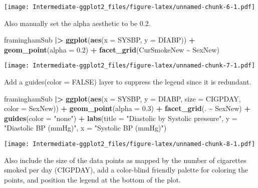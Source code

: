 \documentclass[
]{article}
\newenvironment{Shaded}{\begin{snugshade}}{\end{snugshade}}
\newcommand{\AttributeTok}[1]{\textcolor[rgb]{0.13,0.29,0.53}{#1}}
\newcommand{\FloatTok}[1]{\textcolor[rgb]{0.00,0.00,0.81}{#1}}
\newcommand{\FunctionTok}[1]{\textcolor[rgb]{0.13,0.29,0.53}{\textbf{#1}}}
\newcommand{\NormalTok}[1]{#1}
\newcommand{\SpecialCharTok}[1]{\textcolor[rgb]{0.81,0.36,0.00}{\textbf{#1}}}
\newcommand{\StringTok}[1]{\textcolor[rgb]{0.31,0.60,0.02}{#1}}
\begin{document}
\texttt{[image: Intermediate-ggplot2\_files/figure-latex/unnamed-chunk-6-1.pdf]}

Also manually set the alpha aesthetic to be 0.2.

\begin{Shaded}
\begin{Highlighting}[]
\NormalTok{framinghamSub }\SpecialCharTok{|\textgreater{}} 
  \FunctionTok{ggplot}\NormalTok{(}\FunctionTok{aes}\NormalTok{(}\AttributeTok{x =}\NormalTok{ SYSBP, }\AttributeTok{y =}\NormalTok{ DIABP)) }\SpecialCharTok{+}
  \FunctionTok{geom\_point}\NormalTok{(}\AttributeTok{alpha =} \FloatTok{0.2}\NormalTok{) }\SpecialCharTok{+}
  \FunctionTok{facet\_grid}\NormalTok{(CurSmokeNew }\SpecialCharTok{\textasciitilde{}}\NormalTok{ SexNew)}
\end{Highlighting}
\end{Shaded}

\texttt{[image: Intermediate-ggplot2\_files/figure-latex/unnamed-chunk-7-1.pdf]}

Add a guides(color = FALSE) layer to suppress the legend since it is
redundant.

\begin{Shaded}
\begin{Highlighting}[]
\NormalTok{framinghamSub }\SpecialCharTok{|\textgreater{}}
  \FunctionTok{ggplot}\NormalTok{(}\FunctionTok{aes}\NormalTok{(}\AttributeTok{x =}\NormalTok{ SYSBP, }\AttributeTok{y =}\NormalTok{ DIABP,}
             \AttributeTok{size =}\NormalTok{ CIGPDAY,}
             \AttributeTok{color =}\NormalTok{ SexNew)) }\SpecialCharTok{+}
  \FunctionTok{geom\_point}\NormalTok{(}\AttributeTok{alpha =} \FloatTok{0.3}\NormalTok{) }\SpecialCharTok{+}
  \FunctionTok{facet\_grid}\NormalTok{(. }\SpecialCharTok{\textasciitilde{}}\NormalTok{ SexNew) }\SpecialCharTok{+}
  \FunctionTok{guides}\NormalTok{(}\AttributeTok{color =} \StringTok{"none"}\NormalTok{) }\SpecialCharTok{+}
  \FunctionTok{labs}\NormalTok{(}\AttributeTok{title =} \StringTok{"Diastolic by Systolic pressure"}\NormalTok{,}
       \AttributeTok{y =} \StringTok{"Diastolic BP (mmHg)"}\NormalTok{,}
       \AttributeTok{x =} \StringTok{"Systolic BP (mmHg)"}\NormalTok{)}
\end{Highlighting}
\end{Shaded}

\texttt{[image: Intermediate-ggplot2\_files/figure-latex/unnamed-chunk-8-1.pdf]}

Also include the size of the data points as mapped by the number of
cigarettes smoked per day (CIGPDAY), add a color-blind friendly palette
for coloring the points, and position the legend at the bottom of the
plot.
\end{document}
